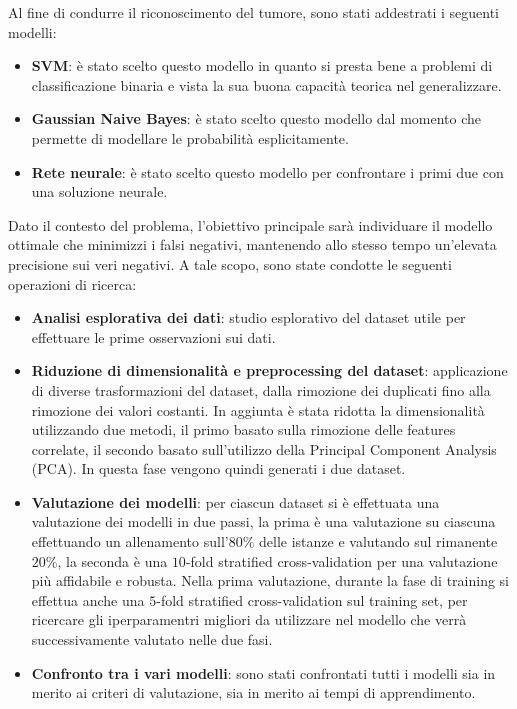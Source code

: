 Al fine di condurre il riconoscimento del tumore, sono stati addestrati i
seguenti modelli:
\begin{itemize}
      \item \textbf{SVM}: è stato scelto questo modello in quanto si presta bene
            a problemi di classificazione binaria e vista la sua buona capacità
            teorica nel generalizzare.
      \item \textbf{Gaussian Naive Bayes}: è stato scelto questo modello dal
            momento che permette di modellare le probabilità esplicitamente.
      \item \textbf{Rete neurale}: è stato scelto questo modello per confrontare
            i primi due con una soluzione neurale.
\end{itemize}
Dato il contesto del problema, l'obiettivo principale sarà individuare il modello
ottimale che minimizzi i falsi negativi, mantenendo allo stesso tempo un'elevata
precisione sui veri negativi. A tale scopo, sono state condotte le seguenti
operazioni di ricerca:
\begin{itemize}
      \item \textbf{Analisi esplorativa dei dati}: studio esplorativo del dataset
            utile per effettuare le prime osservazioni sui dati.
      \item \textbf{Riduzione di dimensionalità e preprocessing del dataset}:
            applicazione di diverse trasformazioni del dataset, dalla rimozione
            dei duplicati fino alla rimozione dei valori costanti. In aggiunta è
            stata ridotta la dimensionalità utilizzando due metodi, il primo
            basato sulla rimozione delle features correlate, il secondo basato
            sull'utilizzo della Principal Component Analysis (PCA). In questa fase
            vengono quindi generati i due dataset.
      \item \textbf{Valutazione dei modelli}: per ciascun dataset si è effettuata
            una valutazione dei modelli in due passi, la prima è una valutazione
            su ciascuna effettuando un allenamento sull'$80\%$ delle istanze e
            valutando sul rimanente $20\%$, la seconda è una $10$-fold stratified
            cross-validation per una valutazione più affidabile e robusta.
            Nella prima valutazione, durante la fase di training si effettua anche
            una $5$-fold stratified cross-validation sul training set, per
            ricercare gli iperparamentri migliori da utilizzare nel modello che
            verrà successivamente valutato nelle due fasi.
      \item \textbf{Confronto tra i vari modelli}: sono stati confrontati tutti
            i modelli sia in merito ai criteri di valutazione, sia in merito ai
            tempi di apprendimento.
\end{itemize}
